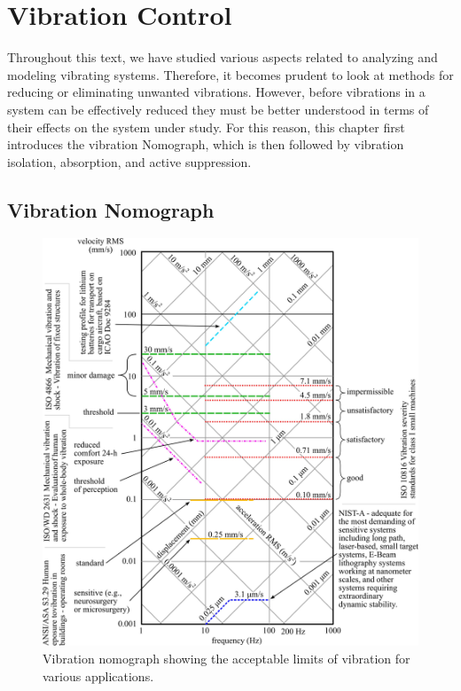 \documentclass[12pt,letter]{article}
\begin{document}
	
	\setcounter{section}{6}	
	\setcounter{figure}{0}   
	\renewcommand\thefigure{\thesection.\arabic{figure}}
	\setcounter{equation}{0}   
	\renewcommand\theequation{\thesection.\arabic{equation}}

	\section{Vibration Control}

Throughout this text, we have studied various aspects related to analyzing and modeling vibrating systems. Therefore, it becomes prudent to look at methods for reducing or eliminating unwanted vibrations. However, before vibrations in a system can be effectively reduced they must be better understood in terms of their effects on the system under study. For this reason, this chapter first introduces the vibration Nomograph, which is then followed by vibration isolation, absorption, and active suppression.  

\subsection{Vibration Nomograph}

\begin{figure}[tp!]
    \centering
    \includegraphics[width=6.5in]{../figures/Vibration_nomograph}
    \caption{Vibration nomograph showing the acceptable limits of vibration for various applications.}
    \label{fig:Vibration_nomograph}
\end{figure}
\end{document}
